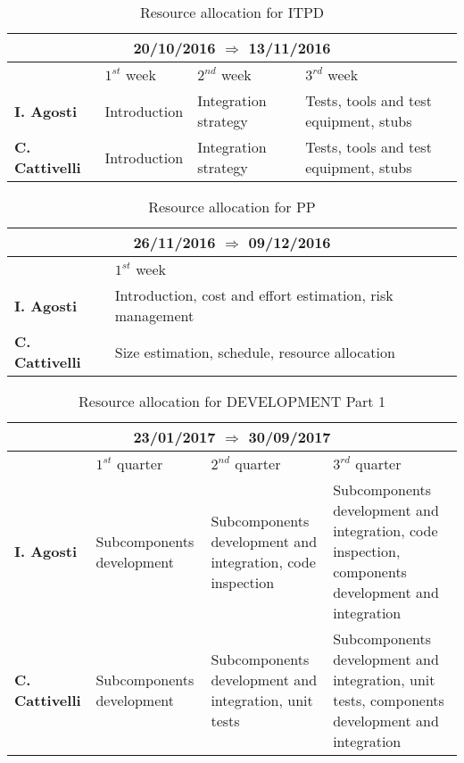 \begin{table}[H]
	\centering
	\begin{tabular}{| m{2.6cm} | m{3.2cm} | m{3.2cm} | m{3.2cm} | }
		\hline
		\multicolumn{4}{|c|}{ \textbf{20/10/2016 $\Rightarrow$ 13/11/2016 } } \\
		\hline
		\hline
		\textbf & \(1^{st}\) week & \(2^{nd}\) week & \(3^{rd}\) week \\
		\hline
		\textbf{I. Agosti} & Introduction & Integration strategy & Tests, tools and test equipment, stubs \\
		\hline
		\textbf{C. Cattivelli} & Introduction & Integration strategy & Tests, tools and test equipment, stubs \\ 
		\hline
	\end{tabular}
	\caption{Resource allocation for ITPD}
\end{table}

\begin{table}[H]
	\centering
	\begin{tabular}{| m{2.6cm} | m{10.4cm} |}
		\hline
		\multicolumn{2}{|c|}{ \textbf{26/11/2016 $\Rightarrow$ 09/12/2016 } } \\
		\hline
		\hline
		\textbf & \(1^{st}\) week \\
		\hline
		\textbf{I. Agosti} & Introduction, cost and effort estimation, risk management \\
		\hline
		\textbf{C. Cattivelli} & Size estimation, schedule, resource allocation \\ 
		\hline
	\end{tabular}
	\caption{Resource allocation for PP}
\end{table}

\begin{table}[H]
	\centering
	\begin{tabular}{| m{2.6cm} | m{3.2cm} | m{3.2cm} | m{3.2cm} | }
		\hline
		\multicolumn{4}{|c|}{ \textbf{23/01/2017 $\Rightarrow$ 30/09/2017 } } \\
		\hline
		\hline
		\textbf & \(1^{st}\) quarter & \(2^{nd}\) quarter & \(3^{rd}\) quarter \\
		\hline
		\textbf{I. Agosti} & Subcomponents development & Subcomponents development and integration, code inspection & Subcomponents development and integration, code inspection, components development and integration \\
		\hline
		\textbf{C. Cattivelli} & Subcomponents development & Subcomponents development and integration, unit tests & Subcomponents development and integration, unit tests, components development and integration \\ 
		\hline
	\end{tabular}
	\caption{Resource allocation for DEVELOPMENT Part 1}
\end{table}

